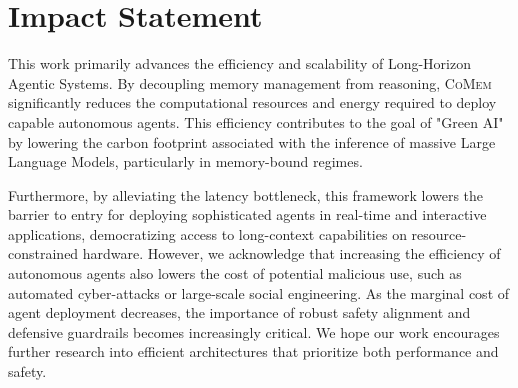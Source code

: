 \documentclass{article}
\theoremstyle{plain}
\theoremstyle{definition}
\theoremstyle{remark}
\newcommand{\model}{\textsc{CoMem}\xspace}
\begin{document}
\section*{Impact Statement}



This work primarily advances the efficiency and scalability of Long-Horizon Agentic Systems. By decoupling memory management from reasoning, \model significantly reduces the computational resources and energy required to deploy capable autonomous agents. This efficiency contributes to the goal of "Green AI" by lowering the carbon footprint associated with the inference of massive Large Language Models, particularly in memory-bound regimes.

Furthermore, by alleviating the latency bottleneck, this framework lowers the barrier to entry for deploying sophisticated agents in real-time and interactive applications, democratizing access to long-context capabilities on resource-constrained hardware. However, we acknowledge that increasing the efficiency of autonomous agents also lowers the cost of potential malicious use, such as automated cyber-attacks or large-scale social engineering. As the marginal cost of agent deployment decreases, the importance of robust safety alignment and defensive guardrails becomes increasingly critical. We hope our work encourages further research into efficient architectures that prioritize both performance and safety.
\end{document}
